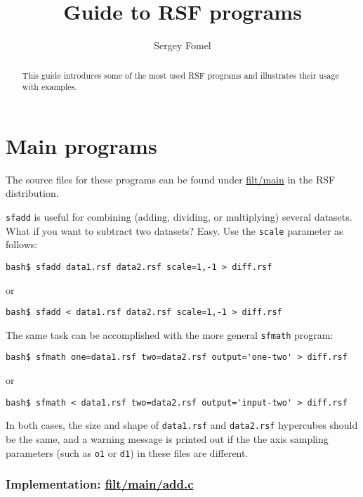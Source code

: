 \title{Guide to RSF programs}
\author{Sergey Fomel}

\maketitle

\begin{abstract}

This guide introduces some of the most used RSF programs and illustrates their
usage with examples.

\end{abstract}

\section{Main programs}

The source files for these programs can be found under
\href{http://svn.sourceforge.net/viewcvs.cgi/rsf/trunk/filt/main/}{filt/main}
in the RSF distribution.

\noindent\doublebox{\parbox{\textwidth}{

}}

\texttt{sfadd} is useful for combining (adding, dividing, or
multiplying) several datasets. What if you want to subtract two
datasets? Easy. Use the \texttt{scale} parameter as follows:
\begin{verbatim}
bash$ sfadd data1.rsf data2.rsf scale=1,-1 > diff.rsf
\end{verbatim}
or
\begin{verbatim}
bash$ sfadd < data1.rsf data2.rsf scale=1,-1 > diff.rsf
\end{verbatim}
The same task can be accomplished with the more general \texttt{sfmath} program:
\begin{verbatim}
bash$ sfmath one=data1.rsf two=data2.rsf output='one-two' > diff.rsf
\end{verbatim}
or
\begin{verbatim}
bash$ sfmath < data1.rsf two=data2.rsf output='input-two' > diff.rsf
\end{verbatim}
In both cases, the size and shape of \texttt{data1.rsf} and
\texttt{data2.rsf} hypercubes should be the same, and a warning
message is printed out if the the axis sampling parameters (such as
\texttt{o1} or \texttt{d1}) in these files are different.

\subsubsection{Implementation: \href{http://svn.sourceforge.net/viewcvs.cgi/rsf/trunk/filt/main/add.c?view=markup}{filt/main/add.c}}

